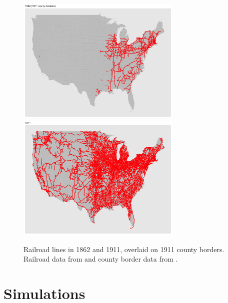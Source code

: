 \documentclass[12pt]{article}
\begin{document}
\begin{figure}[htbp]
	\begin{center}
		\includegraphics[width=0.7\textwidth]{plots/rr-1862.png} \\
		\includegraphics[width=0.7\textwidth]{plots/rr-1911.png} \\
	\end{center}
	\caption{Railroad lines in 1862 and 1911, overlaid on 1911 county borders. Railroad data from \cite{atack2013use} and county border data from \cite{long1995atlas}. \label{rr-map}} 
\end{figure}

\pagebreak
\section{Simulations} \label{sims-sm}
\end{document}
